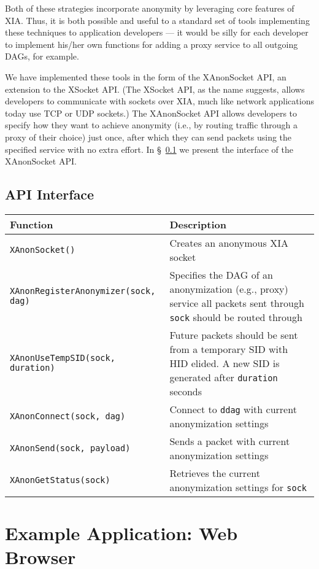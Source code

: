 \documentclass[11pt]{article}
\begin{document}
Both of these strategies incorporate anonymity by leveraging core features of XIA. Thus, it is both possible and useful to a standard set of tools implementing these techniques to application developers --- it would be silly for each developer to implement his/her own functions for adding a proxy service to all outgoing DAGs, for example.

We have implemented these tools in the form of the XAnonSocket API, an extension to the XSocket API. (The XSocket API, as the name suggests, allows developers to communicate with sockets over XIA, much like network applications today use TCP or UDP sockets.) The XAnonSocket API allows developers to specify how they want to achieve anonymity (i.e., by routing traffic through a proxy of their choice) just once, after which they can send packets using the specified service with no extra effort. In \S~\ref{sec:api-interface} we present the interface of the XAnonSocket API.

\subsection{API Interface}
\label{sec:api-interface}

\begin{center}
	\begin{tabular}{l p{7cm}}
	\textbf{Function} 	&	\textbf{Description}\\
	\hline
	\texttt{XAnonSocket()} & Creates an anonymous XIA socket\\
	\texttt{XAnonRegisterAnonymizer(sock, dag)} & Specifies the DAG of an anonymization (e.g., proxy) service all packets sent through \texttt{sock} should be routed through\\
	\texttt{XAnonUseTempSID(sock, duration)} & Future packets should be sent from a temporary SID with HID elided. A new SID is generated after \texttt{duration} seconds\\
	\texttt{XAnonConnect(sock, dag)} & Connect to \texttt{ddag} with current anonymization settings\\
	\texttt{XAnonSend(sock, payload)} & Sends a packet with current anonymization settings\\
	\texttt{XAnonGetStatus(sock)} & Retrieves the current anonymization settings for \texttt{sock}\\
	\hline
	\end{tabular}
\end{center}


\section{Example Application: Web Browser}
\end{document}
